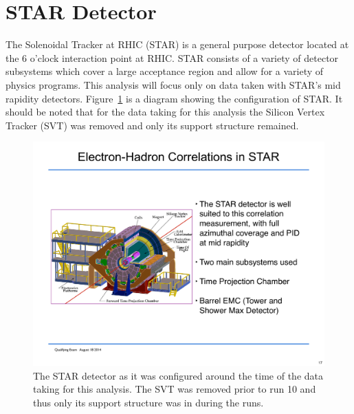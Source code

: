\section{STAR Detector}

The Solenoidal Tracker at RHIC (STAR) is a general purpose detector located at the 6 o'clock interaction point at RHIC. STAR consists of a variety of detector subsystems which cover a large acceptance region and allow for a variety of physics programs. This analysis will focus only on data taken with STAR's mid rapidity detectors. Figure~\ref{fig:STAR} is a diagram showing the configuration of STAR. It should be noted that for the data taking for this analysis the Silicon Vertex Tracker (SVT) was removed and only its support structure remained.

\begin{figure}[htbp]
\begin{center}
\includegraphics[scale=0.7]{Plots/Detector/STAR_Detector.pdf}
\end{center}
\caption[STAR Detector]{The STAR detector as it was configured around the time of the data taking for this analysis. The SVT was removed prior to run 10 and thus only its support structure was in during the runs.}
\label{fig:STAR}
\end{figure}

